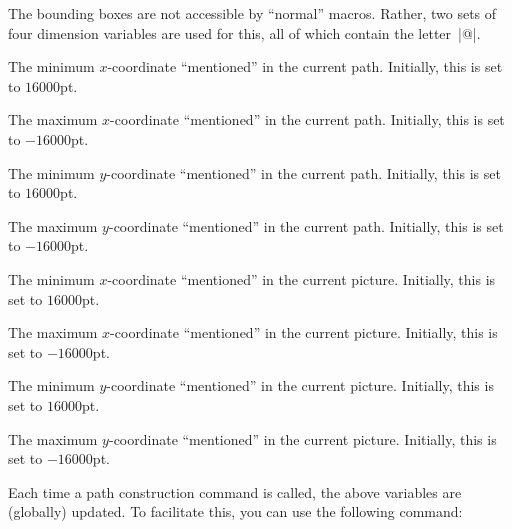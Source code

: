 The bounding boxes are not accessible by ``normal'' macros. Rather, two sets of
four dimension variables are used for this, all of which contain the
letter~|@|.

\begin{textoken}{\pgf@pathminx}
    The minimum $x$-coordinate ``mentioned'' in the current path. Initially,
    this is set to $16000$pt.
\end{textoken}

\begin{textoken}{\pgf@pathmaxx}
    The maximum $x$-coordinate ``mentioned'' in the current path. Initially,
    this is set to $-16000$pt.
\end{textoken}

\begin{textoken}{\pgf@pathminy}
    The minimum $y$-coordinate ``mentioned'' in the current path. Initially,
    this is set to $16000$pt.
\end{textoken}

\begin{textoken}{\pgf@pathmaxy}
    The maximum $y$-coordinate ``mentioned'' in the current path. Initially,
    this is set to $-16000$pt.
\end{textoken}

\begin{textoken}{\pgf@picminx}
    The minimum $x$-coordinate ``mentioned'' in the current picture. Initially,
    this is set to $16000$pt.
\end{textoken}

\begin{textoken}{\pgf@picmaxx}
    The maximum $x$-coordinate ``mentioned'' in the current picture. Initially,
    this is set to $-16000$pt.
\end{textoken}

\begin{textoken}{\pgf@picminy}
    The minimum $y$-coordinate ``mentioned'' in the current picture. Initially,
    this is set to $16000$pt.
\end{textoken}

\begin{textoken}{\pgf@picmaxy}
    The maximum $y$-coordinate ``mentioned'' in the current picture. Initially,
    this is set to $-16000$pt.
\end{textoken}


Each time a path construction command is called, the above variables are
(globally) updated. To facilitate this, you can use the following command:

